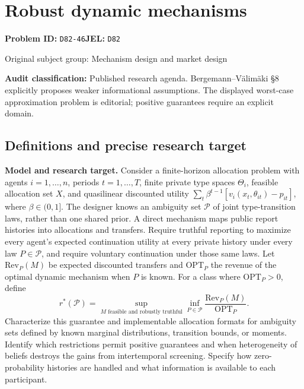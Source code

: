 \documentclass[11pt,a4paper]{article}
\begin{document}
\section*{Robust dynamic mechanisms}
\textbf{Problem ID:} \texttt{D82-46}\quad \textbf{JEL:} \texttt{D82}\par
\label{problem:OP-0290}
{\sffamily\small\color{muted}Original subject group: Mechanism design and market design\par}
\label{definitions:problem:30007572}
\textbf{Audit classification:} Published research agenda. Bergemann–Välimäki §8 explicitly proposes weaker informational assumptions. The displayed worst-case approximation problem is editorial; positive guarantees require an explicit domain.
\subsection*{Definitions and precise research target}
\textbf{Model and research target.} Consider a finite-horizon allocation problem with agents \(i=1,\ldots,n\), periods \(t=1,\ldots,T\), finite private type spaces \(\Theta_i\), feasible allocation set \(X\), and quasilinear discounted utility \(\sum_t\beta^{t-1}[v_i(x_t,\theta_{it})-p_{it}]\), where \(\beta\in(0,1]\). The designer knows an ambiguity set \(\mathcal P\) of joint type-transition laws, rather than one shared prior. A direct mechanism maps public report histories into allocations and transfers. Require truthful reporting to maximize every agent's expected continuation utility at every private history under every law \(P\in\mathcal P\), and require voluntary continuation under those same laws. Let \(\mathrm{Rev}_P(M)\) be expected discounted transfers and \(\mathrm{OPT}_P\) the revenue of the optimal dynamic mechanism when \(P\) is known. For a class where \(\mathrm{OPT}_P>0\), define
\[
 r^*(\mathcal P)=\sup_{M\text{ feasible and robustly truthful}}
 \inf_{P\in\mathcal P}\frac{\mathrm{Rev}_P(M)}{\mathrm{OPT}_P}.
\]
Characterize this guarantee and implementable allocation formats for ambiguity sets defined by known marginal distributions, transition bounds, or moments. Identify which restrictions permit positive guarantees and when heterogeneity of beliefs destroys the gains from intertemporal screening. Specify how zero-probability histories are handled and what information is available to each participant.
\end{document}
